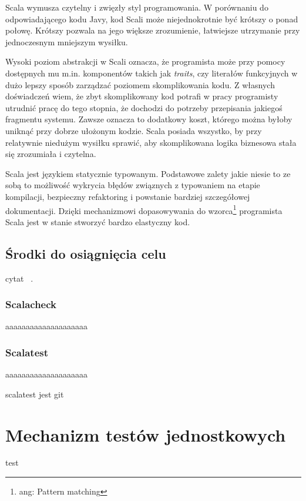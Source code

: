 \documentclass[brudnopis]{xmgr}
\begin{document}
Scala wymusza czytelny i zwięzły styl programowania. W porównaniu do odpowiadającego kodu Javy, kod Scali może niejednokrotnie być krótszy o ponad połowę. Krótszy pozwala na jego większe zrozumienie, łatwiejsze utrzymanie przy jednoczesnym mniejszym wysiłku.

Wysoki poziom abstrakcji w Scali oznacza, że programista może przy pomocy dostępnych mu m.in. komponentów takich jak \textit{traits}, czy literałów funkcyjnych w dużo lepszy sposób zarządzać poziomem skomplikowania kodu. Z własnych doświadczeń wiem, że zbyt skomplikowany kod potrafi w pracy programisty utrudnić pracę do tego stopnia, że dochodzi do potrzeby przepisania jakiegoś fragmentu systemu. Zawsze oznacza to dodatkowy koszt, którego można byłoby uniknąć przy dobrze ułożonym kodzie. Scala posiada wszystko, by przy relatywnie niedużym wysiłku sprawić, aby skomplikowana logika biznesowa stała się zrozumiała i czytelna.

Scala jest językiem statycznie typowanym. Podstawowe zalety jakie niesie to ze sobą to możliwość wykrycia błędów związnych z typowaniem na etapie kompilacji, bezpieczny refaktoring i powstanie bardziej szczegółowej dokumentacji. Dzięki mechanizmowi dopasowywania do wzorca\footnote{ang: Pattern matching} programista Scala jest w stanie stworzyć bardzo elastyczny kod.

\section{Środki do osiągnięcia celu}

cytat ~\cite[s.~123]{Elmasri:2002:CMC}. 

\subsection{Scalacheck}

aaaaaaaaaaaaaaaaaaaa

\subsection{Scalatest} 

aaaaaaaaaaaaaaaaaaaa

scalatest jest git
      
\chapter{Mechanizm testów jednostkowych}

test
    
\end{document}
